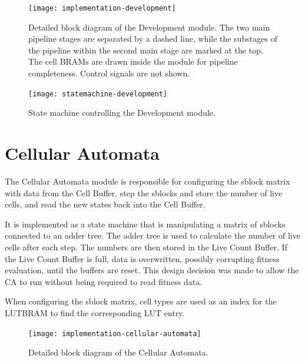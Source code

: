 \begin{figure}[!ht]
    \centering
    \texttt{[image: implementation-development]}
    \caption[Development module]{
        Detailed block diagram of the Development module.
        The two main pipeline stages are separated by a dashed line,
        while the substages of the pipeline within the second main stage are marked at the top.
        The cell BRAMs are drawn inside the module for pipeline completeness.
        Control signals are not shown.
    }
    \label{fig:implementation-development}
\end{figure}

\begin{figure}[!ht]
    \centering
    \texttt{[image: statemachine-development]}
    \caption[Development module state machine]{
        State machine controlling the Development module.
    }
    \label{fig:statemachine-development}
\end{figure}


\section{Cellular Automata}

The Cellular Automata module is responsible for configuring the sblock matrix with data from the Cell Buffer, step the sblocks and store the number of live cells, and read the new states back into the Cell Buffer.

It is implemented as a state machine that is manipulating a matrix of sblocks connected to an adder tree.
The adder tree is used to calculate the number of live cells after each step.
The numbers are then stored in the Live Count Buffer.
If the Live Count Buffer is full, data is overwritten, possibly corrupting fitness evaluation, until the buffers are reset.
This design decision was made to allow the CA to run without being required to read fitness data.

When configuring the sblock matrix, cell types are used as an index for the LUTBRAM to find the corresponding LUT entry.

\begin{figure}[!ht]
    \centering
    \texttt{[image: implementation-cellular-automata]}
    \caption[Cellular Automata]{
        Detailed block diagram of the Cellular Automata.
    }
    \label{fig:implementation-cellular-automata}
\end{figure}

